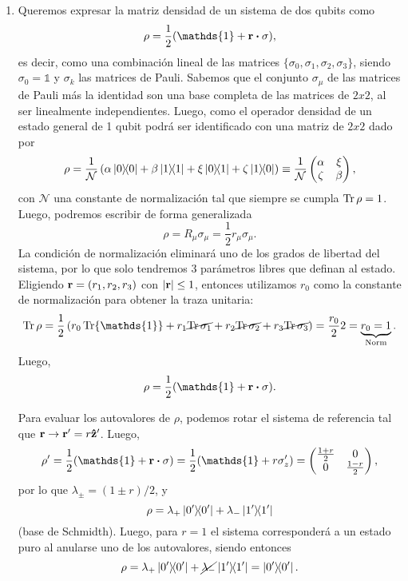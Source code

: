 \documentclass{scrartcl}
\newcommand{\inv}[1]{\frac{1}{#1}}
\DeclareRobustCommand{\[}{\begin{equation}}
\DeclareRobustCommand{\]}{\end{equation}}
\begin{document}
\begin{enumerate}
    
    \item Queremos expresar la matriz densidad de un sistema de dos qubits como
    \[ \rho = \inv{2} (\mathds{1} + \vb{r} \vdot \vb{\sigma}), \]
    es decir, como una combinación lineal de las matrices $\{ \sigma_0, \sigma_1, \sigma_2, \sigma_3 \}$, siendo $\sigma_0 = \mathds{1}$ y $\sigma_k$ las matrices de Pauli. Sabemos que el conjunto ${\sigma_\mu}$ de las matrices de Pauli más la identidad son una base completa de las matrices de $2x2$, al ser linealmente independientes. Luego, como el operador densidad de un estado general de 1 qubit podrá ser identificado con una matriz de $2x2$ dado por
    \[
        \rho = \inv{\mathcal{N}} \left( \alpha \dyad{0}{0} + \beta \dyad{1}{1} + \xi \dyad{0}{1} + \zeta \dyad{1}{0} \right) \equiv \inv{\mathcal{N}}
        \begin{pmatrix}
            \alpha & \xi \\
            \zeta & \beta
        \end{pmatrix},
    \]
    con $\mathcal{N}$ una constante de normalización tal que siempre se cumpla $\Tr \rho = 1$. Luego, podremos escribir de forma generalizada
    \[ \rho = R_\mu \sigma_\mu = \inv{2} r_\mu \sigma_\mu. \]
    La condición de normalización eliminará uno de los grados de libertad del sistema, por lo que solo tendremos 3 parámetros libres que definan al estado. Eligiendo $\vb{r} = (r_1, r_2, r_3)$ con $\abs{\vb{r}} \leq 1$, entonces utilizamos $r_0$ como la constante de normalización para obtener la traza unitaria:
    \[ \Tr\rho = \frac{1}{2} \left( r_0 \Tr\mathds{1} + r_1 \cancel{\Tr\sigma_1} + r_2 \cancel{\Tr\sigma_2} + r_3 \cancel{\Tr\sigma_3} \right) = \frac{r_0}{2} 2 = \underbrace{r_0 = 1}_{\text{Norm}}. \]
    Luego, 
    \[ \rho = \inv{2} (\mathds{1} + \vb{r} \vdot \vb{\sigma}). \]
    
    Para evaluar los autovalores de $\rho$, podemos rotar el sistema de referencia tal que $\vb{r} \to \vb{r}' = r \vu{z}'$. Luego,
    \[
        \rho' = \inv{2} (\mathds{1} + \vb{r} \vdot \vb{\sigma}) = \inv{2} (\mathds{1} + r \sigma_z') =
        \begin{pmatrix}
            \frac{1 + r}{2} & 0 \\
            0 & \frac{1 - r}{2} \\
        \end{pmatrix},
    \]
    por lo que $\lambda_\pm = (1 \pm r)/2$, y
    \[ \rho = \lambda_+ \dyad{0'}{0'} + \lambda_- \dyad{1'}{1'} \]
    (base de Schmidth). Luego, para $r = 1$ el sistema corresponderá a un estado puro al anularse uno de los autovalores, siendo entonces
    \[ \rho = \lambda_+ \dyad{0'}{0'} + \cancel{\lambda_-} \dyad{1'}{1'} = \dyad{0'}{0'}. \]
    

\end{enumerate}
\end{document}

